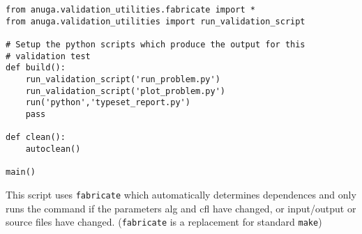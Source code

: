\documentclass[11pt,a4paper]{report}
\begin{document}
\begin{verbatim}
from anuga.validation_utilities.fabricate import *
from anuga.validation_utilities import run_validation_script

# Setup the python scripts which produce the output for this
# validation test
def build():
    run_validation_script('run_problem.py')
    run_validation_script('plot_problem.py')
    run('python','typeset_report.py')
    pass

def clean():
    autoclean()

main()
\end{verbatim}
This script uses \texttt{fabricate} which automatically determines dependences
and only runs the command if the parameters alg and cfl have changed,
or input/output or source files have changed. (\texttt{fabricate} is a replacement for
standard \texttt{make})





\end{document}
